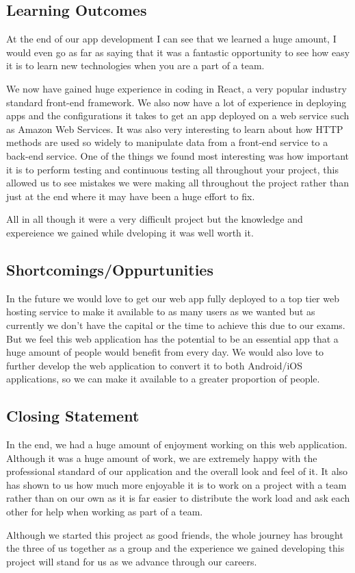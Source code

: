 \subsection{Learning Outcomes}
At the end of our app development I can see that we learned a huge amount, I would even go as far as saying that it was a fantastic opportunity to see how easy it is to learn new technologies when you are a part of a team.
\par
We now have gained huge experience in coding in React, a very popular industry standard front-end framework. We also now have a lot of experience in deploying apps and the configurations it takes to get an app deployed on a web service such as Amazon Web Services. It was also very interesting to learn about how HTTP methods are used so widely to manipulate data from a front-end service to a back-end service. One of the things we found most interesting was how important it is to perform testing and continuous testing all throughout your project, this allowed us to see mistakes we were making all throughout the project rather than just at the end where it may have been a huge effort to fix.
\par
All in all though it were a very difficult project but the knowledge and expereience we gained while dveloping it was well worth it.

\subsection{Shortcomings/Oppurtunities}
In the future we would love to get our web app fully deployed to a top tier web hosting service to make it available to as many users as we wanted but as currently we don’t have the capital or the time to achieve this due to our exams. But we feel this web application has the potential to be an essential app that a huge amount of people would benefit from every day. We would also love to further develop the web application to convert it to both Android/iOS applications, so we can make it available to a greater proportion of people.

\subsection{Closing Statement}
In the end, we had a huge amount of enjoyment working on this web application. Although it was a huge amount of work, we are extremely happy with the professional standard of our application and the overall look and feel of it. It also has shown to us how much more enjoyable it is to work on a project with a team rather than on our own as it is far easier to distribute the work load and ask each other for help when working as part of a team. 
\par
Although we started this project as good friends, the whole journey has brought the three of us together as a group and the experience we gained developing this project will stand for us as we advance through our careers.

